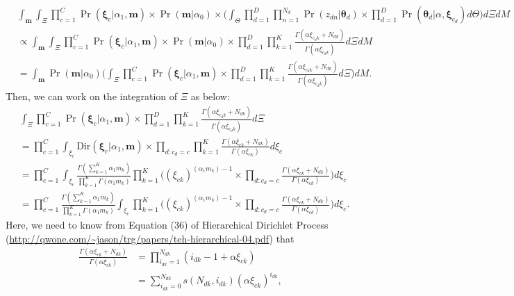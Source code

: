 \documentclass[12pt]{article}
\begin{document}
\begin{equation}
\begin{aligned}
& \int_{\boldsymbol{m}}\int_{{\Xi}}\prod_{c=1}^C \Pr(\boldsymbol{\xi}_c|\alpha_1, \boldsymbol{m})  \times \Pr(\boldsymbol{m}|\alpha_0) \times \Big(\int_{\Theta}\prod_{d=1}^D \prod_{n=1}^{N_d}\Pr(z_{dn}|\boldsymbol{\theta}_d) \times\prod_{d=1}^D \Pr(\boldsymbol{\theta}_d|\alpha, \boldsymbol{\xi}_{c_d}) d\Theta \Big)d \Xi dM\\&\propto\int_{\boldsymbol{m}}\int_{{\Xi}} \prod_{c=1}^C \Pr(\boldsymbol{\xi}_c|\alpha_1, \boldsymbol{m})  \times \Pr(\boldsymbol{m}|\alpha_0) \times \prod_{d=1}^D\prod_{k=1}^K\frac{\Gamma(\alpha\xi_{c_dk}+N_{dk})}{\Gamma(\alpha\xi_{c_dk})} d \Xi dM\\& =\int_{\boldsymbol{m}}  \Pr(\boldsymbol{m}|\alpha_0) \Big(\int_{{\Xi}} \prod_{c=1}^C \Pr(\boldsymbol{\xi}_c|\alpha_1, \boldsymbol{m})\times \prod_{d=1}^D\prod_{k=1}^K\frac{\Gamma(\alpha\xi_{c_dk}+N_{dk})}{\Gamma(\alpha\xi_{c_dk})}  d \Xi\Big) dM.
\end{aligned}
\end{equation}
Then, we can work on the integration of $\Xi$ as below:
\begin{equation}
\begin{aligned}
&\int_{{\Xi}} \prod_{c=1}^C \Pr(\boldsymbol{\xi}_c|\alpha_1, \boldsymbol{m})\times \prod_{d=1}^D\prod_{k=1}^K\frac{\Gamma(\alpha\xi_{c_dk}+N_{dk})}{\Gamma(\alpha\xi_{c_dk})}  d \Xi\\& = \prod_{c=1}^C\int_{{\xi}_c} \mbox{Dir}(\boldsymbol{\xi}_c|\alpha_1, \boldsymbol{m}) \times \prod_{d:c_d = c} \prod_{k=1}^K\frac{\Gamma(\alpha\xi_{ck}+N_{dk})}{\Gamma(\alpha\xi_{ck})}   d\xi_c\\&
 = \prod_{c=1}^C\int_{{\xi}_c} \frac{\Gamma(\sum_{k=1}^K \alpha_1 m_{k})}{\prod_{k=1}^K\Gamma(\alpha_1 m_{k})}\prod_{k=1}^K \Big((\xi_{ck})^{(\alpha_1 m_k)-1} \times  \prod_{d:c_d = c} \frac{\Gamma(\alpha\xi_{ck}+N_{dk})}{\Gamma(\alpha\xi_{ck})}\Big) d\xi_c\\&  = \prod_{c=1}^C\frac{\Gamma(\sum_{k=1}^K \alpha_1 m_{k})}{\prod_{k=1}^K\Gamma(\alpha_1 m_{k})}\int_{{\xi}_c} \prod_{k=1}^K \Big((\xi_{ck})^{(\alpha_1 m_k)-1} \times  \prod_{d:c_d = c} \frac{\Gamma(\alpha\xi_{ck}+N_{dk})}{\Gamma(\alpha\xi_{ck})}\Big) d\xi_c.
\end{aligned}
\end{equation}
Here, we need to know from Equation (36) of Hierarchical Dirichlet Process (\url{http://qwone.com/~jason/trg/papers/teh-hierarchical-04.pdf}) that 
\begin{equation}
\begin{aligned}
\frac{\Gamma(\alpha\xi_{ck}+N_{dk})}{\Gamma(\alpha\xi_{ck})}&= \prod_{i_{dk}=1}^{N_{dk}}(i_{dk}-1+\alpha\xi_{ck})\\& = \sum_{i_{dk}=0}^{N_{dk}} s(N_{dk}, i_{dk}) (\alpha\xi_{ck})^{i_{dk}},
\end{aligned}
\end{equation}
\end{document}

